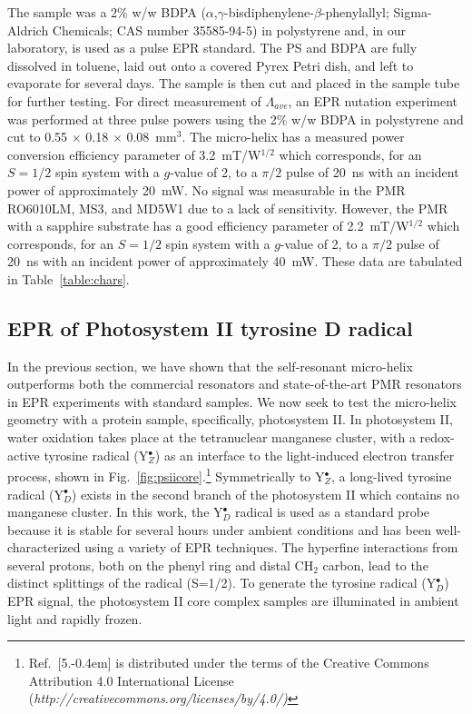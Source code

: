 The sample was a 2\% w/w BDPA ($\alpha$,$\gamma$-bisdiphenylene-$\beta$-phenylallyl; Sigma-Aldrich Chemicals; CAS number 35585-94-5) in polystyrene and, in our laboratory, is used as a pulse EPR standard. The PS and BDPA are fully dissolved in toluene, laid out onto a covered Pyrex Petri dish, and left to evaporate for several days. The sample is then cut and placed in the sample tube for further testing. For direct measurement of $\Lambda_{ave}$, an EPR nutation experiment was performed at three pulse powers using the 2\% w/w BDPA in polystyrene and cut to 0.55 $\times$ 0.18 $\times$ 0.08~mm$^3$. The micro-helix has a measured power conversion efficiency parameter of 3.2~mT/W$^{1/2}$ which corresponds, for an $S=1/2$ spin system with a $g$-value of 2, to a $\pi/2$ pulse of 20~ns with an incident power of approximately 20~mW. No signal was measurable in the PMR RO6010LM, MS3, and MD5W1 due to a lack of sensitivity. However, the PMR with a sapphire substrate has a good efficiency parameter of 2.2~mT/W$^{1/2}$ which corresponds, for an $S=1/2$ spin system with a $g$-value of 2, to a $\pi/2$ pulse of 20~ns with an incident power of approximately 40~mW. These data are tabulated in Table~\ref{table:chars}.

\subsection{EPR of Photosystem II tyrosine D radical}
In the previous section, we have shown that the self-resonant micro-helix outperforms both the commercial resonators and state-of-the-art PMR resonators in EPR experiments with standard samples. We now seek to test the micro-helix geometry with a protein sample, specifically, photosystem II. In photosystem II, water oxidation takes place at the tetranuclear manganese cluster, with a redox-active tyrosine radical (Y$_Z^\bullet$) as an interface to the light-induced electron transfer process, \cite{Lubitz2019} shown in Fig.~\ref{fig:psiicore}.\footnote{Ref.~[5.\kern-0.4em] is distributed under the terms of the Creative Commons Attribution 4.0 International License (\textit{http://creativecommons.org/licenses/by/4.0/)}} Symmetrically to Y$_Z^\bullet$, a long-lived tyrosine radical (Y$_D^\bullet$) exists in the second branch of the photosystem II which contains no manganese cluster. In this work, the Y$_D^\bullet$ radical is used as a standard probe because it is stable for several hours under ambient conditions\cite{Saito7690} and has been well-characterized using a variety of EPR techniques. \cite{Hofbauer6623, STYRING201276} The hyperfine interactions from several protons, both on the phenyl ring and distal CH$_2$ carbon, lead to the distinct splittings of the radical (S=1/2). To generate the tyrosine radical (Y$_D^\bullet$) EPR signal, the photosystem II core complex samples are illuminated in ambient light and rapidly frozen. 

